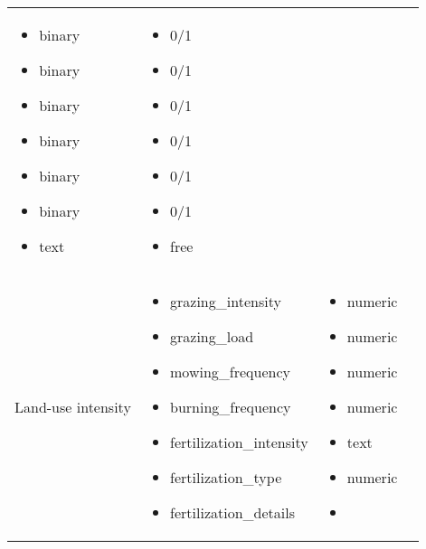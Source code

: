 \documentclass[table]{article}
\providecommand{\tightlist}{%
  \setlength{\itemsep}{0pt}\setlength{\parskip}{0pt}}
\begin{document}
\begin{longtable}[]{@{}llll@{}}
\begin{minipage}[t]{0.24\columnwidth}
\begin{itemize}
\tightlist
\item
  binary
\item
  binary
\item
  binary
\item
  binary
\item
  binary
\item
  binary
\item
  text
\end{itemize}\strut
\end{minipage} & \begin{minipage}[t]{0.24\columnwidth}\raggedright\strut
\begin{itemize}
\tightlist
\item
  0/1
\item
  0/1
\item
  0/1
\item
  0/1
\item
  0/1
\item
  0/1
\item
  free
\end{itemize}\strut
\end{minipage}\tabularnewline
\begin{minipage}[t]{0.24\columnwidth}\raggedright\strut
Land-use intensity\strut
\end{minipage} & \begin{minipage}[t]{0.24\columnwidth}\raggedright\strut
\begin{itemize}
\tightlist
\item
  grazing\_intensity
\item
  grazing\_load
\item
  mowing\_frequency
\item
  burning\_frequency
\item
  fertilization\_intensity
\item
  fertilization\_type
\item
  fertilization\_details
\end{itemize}\strut
\end{minipage} & \begin{minipage}[t]{0.24\columnwidth}\raggedright\strut
\begin{itemize}
\tightlist
\item
  numeric
\item
  numeric
\item
  numeric
\item
  numeric
\item
  text
\item
  numeric
\item

\end{itemize}
\end{minipage}
\end{longtable}
\end{document}
